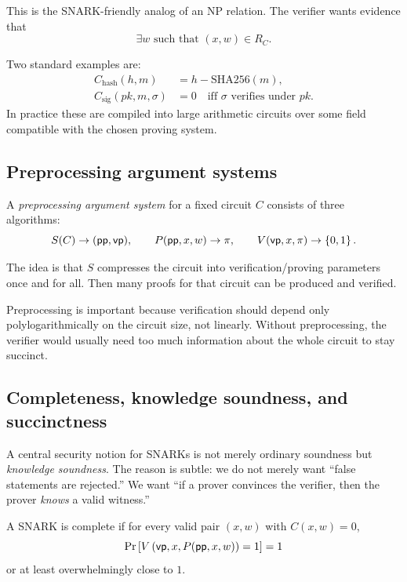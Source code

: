 This is the SNARK-friendly analog of an NP relation. The verifier wants evidence that
\[
\exists w \text{ such that } (x,w)\in R_C.
\]

\begin{example}
Two standard examples are:
\begin{align*}
C_{\mathrm{hash}}(h,m) &= h - \mathrm{SHA256}(m),\\
C_{\mathrm{sig}}(pk,m,\sigma) &= 0 \quad \text{iff } \sigma \text{ verifies under } pk.
\end{align*}
In practice these are compiled into large arithmetic circuits over some field compatible with the chosen proving system.
\end{example}

\subsection{Preprocessing argument systems}

A \emph{preprocessing argument system} for a fixed circuit $C$ consists of three algorithms:
\[
S(C) \to (\mathsf{pp},\mathsf{vp}),\qquad P(\mathsf{pp},x,w) \to \pi,\qquad V(\mathsf{vp},x,\pi)\to\left\{0,1\right\}.
\]

The idea is that $S$ compresses the circuit into verification/proving parameters once and for all. Then many proofs for that circuit can be produced and verified.

Preprocessing is important because verification should depend only polylogarithmically on the circuit size, not linearly. Without preprocessing, the verifier would usually need too much information about the whole circuit to stay succinct.

\subsection{Completeness, knowledge soundness, and succinctness}

A central security notion for SNARKs is not merely ordinary soundness but \emph{knowledge soundness}. The reason is subtle: we do not merely want ``false statements are rejected.'' We want ``if a prover convinces the verifier, then the prover \emph{knows} a valid witness.''

\begin{definition}[Completeness]
A SNARK is complete if for every valid pair $(x,w)$ with $C(x,w)=0$,
\[
\Pr\left[V\left(\mathsf{vp},x,P(\mathsf{pp},x,w)\right)=1\right]=1
\]
or at least overwhelmingly close to $1$.
\end{definition}

